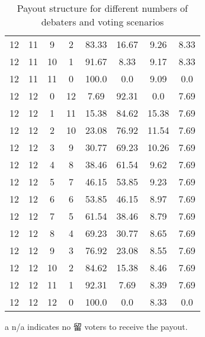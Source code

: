 \documentclass[9pt]{article}
\begin{document}
\begin{table}[h]
\begin{threeparttable}
\begin{tabular}{cccccccc}
12 & 11 & 9 & 2 & 83.33 & 16.67 & 9.26 & 8.33 \\
12 & 11 & 10 & 1 & 91.67 & 8.33 & 9.17 & 8.33 \\
12 & 11 & 11 & 0 & 100.0 & 0.0 & 9.09 & 0.0 \\
12 & 12 & 0 & 12 & 7.69 & 92.31 & 0.0 & 7.69 \\
12 & 12 & 1 & 11 & 15.38 & 84.62 & 15.38 & 7.69 \\
12 & 12 & 2 & 10 & 23.08 & 76.92 & 11.54 & 7.69 \\
12 & 12 & 3 & 9 & 30.77 & 69.23 & 10.26 & 7.69 \\
12 & 12 & 4 & 8 & 38.46 & 61.54 & 9.62 & 7.69 \\
12 & 12 & 5 & 7 & 46.15 & 53.85 & 9.23 & 7.69 \\
12 & 12 & 6 & 6 & 53.85 & 46.15 & 8.97 & 7.69 \\
12 & 12 & 7 & 5 & 61.54 & 38.46 & 8.79 & 7.69 \\
12 & 12 & 8 & 4 & 69.23 & 30.77 & 8.65 & 7.69 \\
12 & 12 & 9 & 3 & 76.92 & 23.08 & 8.55 & 7.69 \\
12 & 12 & 10 & 2 & 84.62 & 15.38 & 8.46 & 7.69 \\
12 & 12 & 11 & 1 & 92.31 & 7.69 & 8.39 & 7.69 \\
12 & 12 & 12 & 0 & 100.0 & 0.0 & 8.33 & 0.0 \\

\bottomrule
\end{tabular}
\begin{tablenotes}
    \item[a] n/a indicates no 留 voters to receive the payout.
\end{tablenotes}
\caption{Payout structure for different numbers of debaters and voting scenarios}
\end{threeparttable}
\end{table}
\end{document}
